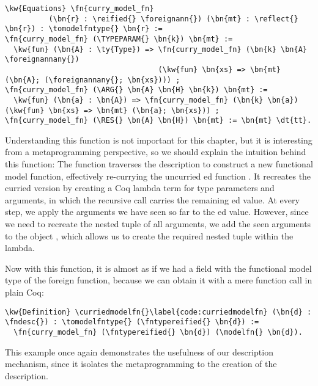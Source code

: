 \begin{Verbatim}
\kw{Equations} \fn{curry_model_fn}
          (\bn{r} : \reified{} \foreignann{}) (\bn{mt} : \reflect{} \bn{r}) : \tomodelfntype{} \bn{r} :=
\fn{curry_model_fn} (\TYPEPARAM{} \bn{k}) \bn{mt} :=
  \kw{fun} (\bn{A} : \ty{Type}) => \fn{curry_model_fn} (\bn{k} \bn{A} \foreignannany{})
                                   (\kw{fun} \bn{xs} => \bn{mt} (\bn{A}; (\foreignannany{}; \bn{xs}))) ;
\fn{curry_model_fn} (\ARG{} \bn{A} \bn{H} \bn{k}) \bn{mt} :=
  \kw{fun} (\bn{a} : \bn{A}) => \fn{curry_model_fn} (\bn{k} \bn{a}) (\kw{fun} \bn{xs} => \bn{mt} (\bn{a}; \bn{xs})) ;
\fn{curry_model_fn} (\RES{} \bn{A} \bn{H}) \bn{mt} := \bn{mt} \dt{tt}.
\end{Verbatim}

Understanding this function is not important for this chapter, but it is interesting from a \gls{metaprogramming} perspective, so we should explain the intuition behind this function: The function traverses the \reified{} description to construct a new \gls{functional model} function, effectively re-currying the uncurried ed function . It recreates the curried version by creating a Coq lambda term for type parameters and arguments, in which the recursive call carries the remaining ed value. At every step, we apply the arguments we have seen so far to the ed value. However, since we need to recreate the nested tuple of all arguments, we add the seen arguments to the \args{} object , which allows us to create the required nested tuple within the lambda.

Now with this function, it is almost as if we had a field with the \gls{functional model} type of the \gls{foreign function}, because we can obtain it with a mere function call in plain Coq:

\newcommand{\curriedmodelfn}{\hyperref[code:curriedmodelfn]{\fn{curried\_\linebreak[0]model\_\linebreak[0]fn}}}
\begin{Verbatim}
\kw{Definition} \curriedmodelfn{}\label{code:curriedmodelfn} (\bn{d} : \fndesc{}) : \tomodelfntype{} (\fntypereified{} \bn{d}) :=
  \fn{curry_model_fn} (\fntypereified{} \bn{d}) (\modelfn{} \bn{d}).
\end{Verbatim}

This example once again demonstrates the usefulness of our \reified{} description mechanism, since it isolates the \gls{metaprogramming} to the creation of the description.

